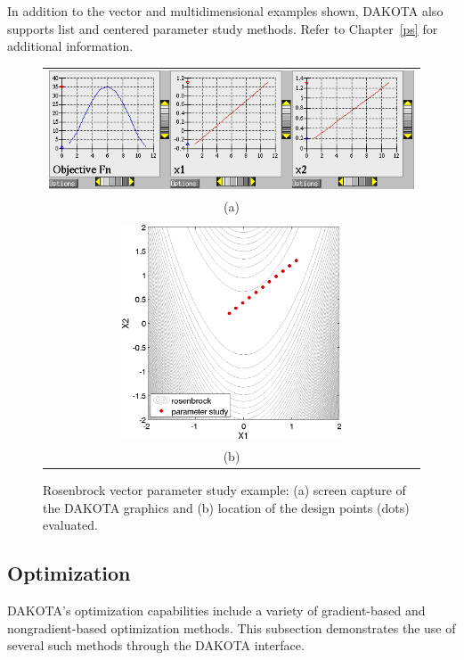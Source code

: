 In addition to the vector and multidimensional examples shown, DAKOTA
also supports list and centered parameter study methods. Refer to
Chapter~\ref{ps} for additional information.

\begin{figure}[htp!]
  \centering
  \begin{tabular}{c}
  \includegraphics[width=\textwidth]{images/dak_graphics_vector}\\
  (a)\\
  \qquad\\
  \includegraphics[height=2.5in]{images/rosen_vect_pts} \\
  (b)
  \end{tabular}
  \caption{Rosenbrock vector parameter study example: (a) screen
    capture of the DAKOTA graphics and (b) location of the design
    points (dots) evaluated.}
  \label{tutorial:rosenbrock_vector_graphics}
\end{figure}

\subsection{Optimization}\label{tutorial:example:optimization}

DAKOTA's optimization capabilities include a variety of gradient-based 
and nongradient-based optimization methods. This subsection demonstrates
the use of several such methods through the DAKOTA interface.

